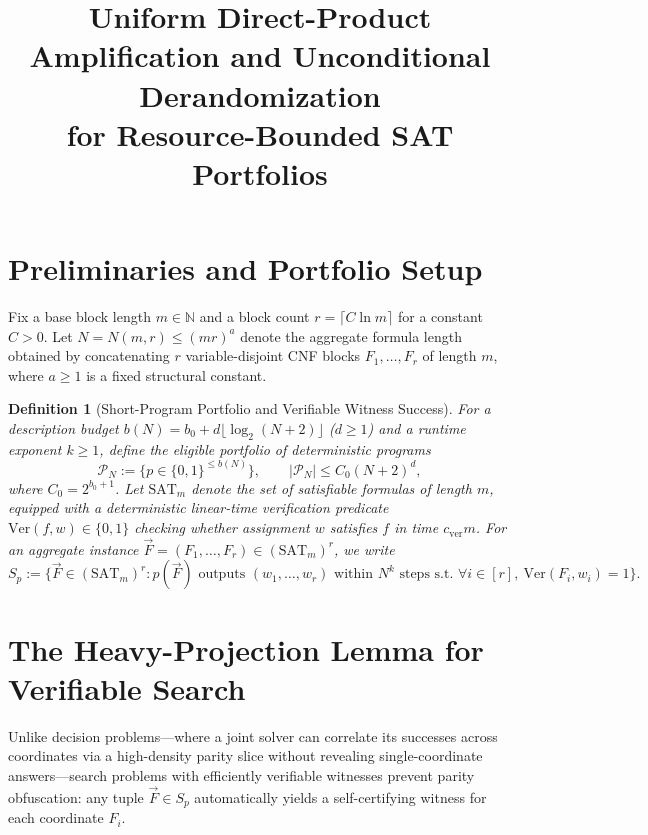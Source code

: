 \documentclass[11pt]{article}
\title{\textbf{Uniform Direct-Product Amplification and Unconditional Derandomization\\for Resource-Bounded SAT Portfolios}}
\author{}
\date{}
\newtheorem{definition}[theorem]{Definition}
\begin{document}
\maketitle

\section{Preliminaries and Portfolio Setup}

Fix a base block length $m \in \mathbb{N}$ and a block count $r = \lceil C \ln m \rceil$ for a constant $C > 0$. Let $N = N(m,r) \le (mr)^a$ denote the aggregate formula length obtained by concatenating $r$ variable-disjoint CNF blocks $F_1,\dots,F_r$ of length $m$, where $a \ge 1$ is a fixed structural constant.

\begin{definition}[Short-Program Portfolio and Verifiable Witness Success]
For a description budget $b(N) = b_0 + d \lfloor \log_2(N+2) \rfloor$ ($d \ge 1$) and a runtime exponent $k \ge 1$, define the eligible portfolio of deterministic programs
\[
  \mathcal{P}_N := \big\{ p \in \{0,1\}^{\le b(N)} \big\}, \qquad |\mathcal{P}_N| \le C_0 (N+2)^d,
\]
where $C_0 = 2^{b_0+1}$. Let $\mathrm{SAT}_m$ denote the set of satisfiable formulas of length $m$, equipped with a deterministic linear-time verification predicate $\mathrm{Ver}(f, w) \in \{0,1\}$ checking whether assignment $w$ satisfies $f$ in time $c_{\mathrm{ver}} m$. For an aggregate instance $\vec{F} = (F_1,\dots,F_r) \in (\mathrm{SAT}_m)^r$, we write
\[
  S_p := \Big\{ \vec{F} \in (\mathrm{SAT}_m)^r : p(\vec{F}) \text{ outputs } (w_1,\dots,w_r) \text{ within } N^k \text{ steps s.t. } \forall i \in [r],\ \mathrm{Ver}(F_i, w_i) = 1 \Big\}.
\]
\end{definition}

\section{The Heavy-Projection Lemma for Verifiable Search}

Unlike decision problems—where a joint solver can correlate its successes across coordinates via a high-density parity slice without revealing single-coordinate answers—search problems with efficiently verifiable witnesses prevent parity obfuscation: any tuple $\vec{F} \in S_p$ automatically yields a self-certifying witness for each coordinate $F_i$.
\end{document}
